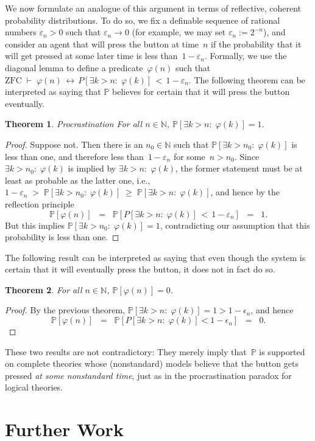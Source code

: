 \documentclass[12pt]{article}
\newcommand{\PP}{\mathbb{P}}
\newcommand{\NN}{\mathbb{N}}
\newcommand{\zfc}{\mathrm{ZFC}}
\theoremstyle{plain}
\newtheorem{theorem}{Theorem}[subsection]
\theoremstyle{definition}
\theoremstyle{remark}
\begin{document}
We now formulate an analogue of this argument in terms of reflective, coherent probability  distributions.
To do so, we fix a definable sequence of rational numbers $\varepsilon_n > 0$ such that $\varepsilon_n\to0$ (for example, we may set $\varepsilon_n := 2^{-n}$), and consider an agent that will press the button at time~$n$ if the probability that it will get pressed at some later time is less than~$1-\varepsilon_n$. Formally, we use the diagonal lemma to define a predicate~$\varphi(n)$ such that $\zfc\;\vdash\;\varphi(n)\,\leftrightarrow\, P[\exists k>n{:}\;\varphi(k)] \,<\, 1 - \varepsilon_n$.
The following theorem can be interpreted as saying that $\PP$ believes for certain that it will press the button eventually.
\begin{theorem} \emph{Procrastination}
For all $n\in\NN$, $\PP[\exists k>n{:}\;\varphi(k)] = 1$.
\end{theorem}
\begin{proof}
Suppose not. Then there is an $n_0\in\NN$ such that $\PP[\exists k>n_0{:}\;\varphi(k)]$ is less than one, and therefore less than~$1 - \varepsilon_n$ for some~$n>n_0$. Since $\exists k>n_0{:}\;\varphi(k)$ is implied by $\exists k>n{:}\; \varphi(k)$, the former statement must be at least as probable as the latter one, i.e., $1 - \varepsilon_n \;>\; \PP[\exists k>n_0{:}\; \varphi(k)] \;\ge\; \PP[\exists k>n{:}\;\varphi(k)]$, and hence by the reflection principle
\[
\PP[\varphi(n)] \;\;=\;\; \PP[P[\exists k>n{:}\;\varphi(k)] \,<\, 1 - \varepsilon_n] \;\;=\;\; 1.
\]
But this implies $\PP[\exists k>n_0{:}\;\varphi(k)] = 1$, contradicting our assumption that this probability is less than one.
\end{proof}
The following result can be interpreted as saying that even though the system is certain that it will eventually press the button, it does not in fact do so.
\begin{theorem}
For all $n\in\NN$, $\PP[\varphi(n)] = 0$.
\end{theorem}
\begin{proof}
By the previous theorem, $\PP[\exists k>n{:}\;\varphi(k)] = 1 > 1 - \epsilon_n$, and hence
\[
\PP[\varphi(n)] \;\;=\;\; \PP[P[\exists k>n{:}\;\varphi(k)] < 1 - \epsilon_n] \;\;=\;\; 0.
\]
\end{proof}
These two results are not contradictory: They merely imply that~$\PP$ is supported on complete theories whose (nonstandard) models believe that the button gets pressed \emph{at some nonstandard time}, just as in the procrastination paradox for logical theories.
\section{Further Work}
\label{further-work}
\end{document}
